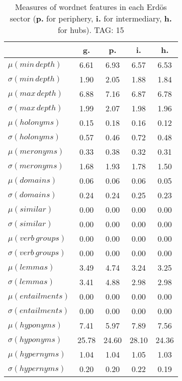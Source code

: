 \begin{table}[h!]
\begin{center}
\begin{tabular}{| l || c | c | c | c |}\hline
 & {\bf g.} & {\bf p.} & {\bf i.} & {\bf h.} \\\hline\hline
$\mu(min\,depth)$ & 6.61  & 6.93  & 6.57  & 6.53 \\
$\sigma(min\,depth)$ & 1.90  & 2.05  & 1.88  & 1.84 \\\hline
$\mu(max\,depth)$ & 6.88  & 7.16  & 6.87  & 6.78 \\
$\sigma(max\,depth)$ & 1.99  & 2.07  & 1.98  & 1.96 \\\hline
$\mu(holonyms)$ & 0.15  & 0.18  & 0.16  & 0.12 \\
$\sigma(holonyms)$ & 0.57  & 0.46  & 0.72  & 0.48 \\\hline
$\mu(meronyms)$ & 0.33  & 0.38  & 0.32  & 0.31 \\
$\sigma(meronyms)$ & 1.68  & 1.93  & 1.78  & 1.50 \\\hline
$\mu(domains)$ & 0.06  & 0.06  & 0.06  & 0.05 \\
$\sigma(domains)$ & 0.24  & 0.24  & 0.25  & 0.23 \\\hline
$\mu(similar)$ & 0.00  & 0.00  & 0.00  & 0.00 \\
$\sigma(similar)$ & 0.00  & 0.00  & 0.00  & 0.00 \\\hline
$\mu(verb\,groups)$ & 0.00  & 0.00  & 0.00  & 0.00 \\
$\sigma(verb\,groups)$ & 0.00  & 0.00  & 0.00  & 0.00 \\\hline
$\mu(lemmas)$ & 3.49  & 4.74  & 3.24  & 3.25 \\
$\sigma(lemmas)$ & 3.41  & 4.88  & 2.98  & 2.98 \\\hline
$\mu(entailments)$ & 0.00  & 0.00  & 0.00  & 0.00 \\
$\sigma(entailments)$ & 0.00  & 0.00  & 0.00  & 0.00 \\\hline
$\mu(hyponyms)$ & 7.41  & 5.97  & 7.89  & 7.56 \\
$\sigma(hyponyms)$ & 25.78  & 24.60  & 28.10  & 24.36 \\\hline
$\mu(hypernyms)$ & 1.04  & 1.04  & 1.05  & 1.03 \\
$\sigma(hypernyms)$ & 0.20  & 0.20  & 0.22  & 0.19 \\\hline
\end{tabular}
\caption{Measures of wordnet features in each Erd\"os sector ({{\bf p.}} for periphery, {{\bf i.}} for intermediary, {{\bf h.}} for hubs). TAG: 15}
\end{center}
\end{table}